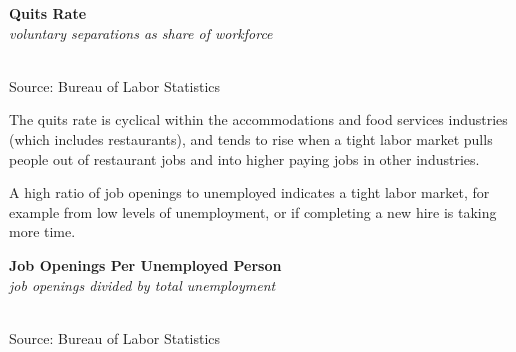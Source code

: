 \documentclass{report}
\makeatletter
\newcommand{\tbllink}[1]{\href{https://raw.githubusercontent.com/bdecon/US-chartbook/master/chartbook/data/#1}{\faTable}}
\newcommand*\short[1]{\expandafter\@gobbletwo\number\numexpr#1\relax}
\newcommand{\absnode}[3]{\node[below right, align=left] at (axis cs: #1,#2) {#3};}
\newcommand{\dateaxisticks}{
		date coordinates in=x, axis line style={draw=none},
		xmax={2023-10-01},
		max space between ticks=40,	    
		xtick={{1990-01-01}, {1992-01-01}, {1994-01-01}, 
			{1996-01-01}, {1998-01-01}, {2000-01-01}, 
			{2002-01-01}, {2004-01-01}, {2006-01-01},
			{2008-01-01}, {2010-01-01}, {2012-01-01}, {2014-01-01},
		    {2016-01-01}, {2018-01-01}, {2020-01-01}, {2022-01-01}, 
		    {2024-01-01}, {2026-01-01}},
		minor xtick={{1989-01-01}, {1991-01-01}, {1993-01-01},
			{1995-01-01}, {1997-01-01}, {1999-01-01}, 
			{2001-01-01}, {2003-01-01}, {2005-01-01}, {2007-01-01},
		    {2009-01-01}, {2011-01-01}, {2013-01-01}, {2015-01-01},
		    {2017-01-01}, {2019-01-01}, {2021-01-01}, {2023-01-01}, 
		    {2025-01-01}, {2027-01-01}},
		enlarge y limits={0.06}, enlarge x limits={0.01},
		}
\newcommand{\shdateaxisticks}{
		date coordinates in=x, axis line style={draw=none},
		xmax={2023-10-01},
		max space between ticks=40,	    
		xtick={{1990-01-01}, {1995-01-01}, {2000-01-01}, 
			{2005-01-01}, {2010-01-01}, {2015-01-01}, {2020-01-01}},
		minor xtick={},
		enlarge y limits={0.06}, enlarge x limits={0.01},
		}
\newcommand{\bbar}[2]{extra #1 ticks = {{#2}}, extra #1 tick labels = ,
		extra #1 tick style = {grid=major, grid style={thick, black!25}},}
\newcommand{\stdline}[4]{\addplot[very thick, no markers, color=#1] 
		table [x=#2, y=#3, col sep=comma] {#4};	}
\newcommand{\thinline}[4]{\addplot[no markers, color=#1] 
		table [x=#2, y=#3, col sep=comma] {#4};	}
\newcommand{\thickline}[4]{\addplot[ultra thick, no markers, color=#1] 
		table [x=#2, y=#3, col sep=comma] {#4};	}
\newcommand{\rebars}{
		\fill[color=black!10] (axis cs:{2007-12-01},\pgfkeysvalueof{/pgfplots/ymin}) rectangle 
			(axis cs:{2009-07-01}, \pgfkeysvalueof{/pgfplots/ymax});
		\fill[color=black!10] (axis cs:{2001-03-01},\pgfkeysvalueof{/pgfplots/ymin}) rectangle 
			(axis cs:{2001-11-01}, \pgfkeysvalueof{/pgfplots/ymax});
		\fill[color=black!10] (axis cs:{2020-02-01},\pgfkeysvalueof{/pgfplots/ymin}) rectangle 
			(axis cs:{2020-05-01}, \pgfkeysvalueof{/pgfplots/ymax});}
\makeatother
\begin{document}
{\begin{minipage}{0.4\textwidth}
\normalsize \textbf{Quits Rate}\\
\footnotesize{\textit{voluntary separations as share of workforce}}\\
\hspace*{-2mm} \\
\footnotesize{Source: Bureau of Labor Statistics} \hfill \tbllink{quits.csv}
\end{minipage}
\hspace{6mm}
\begin{minipage}{0.31\textwidth}
\small The quits rate is cyclical within the accommodations and food services industries (which includes restaurants), and tends to rise when a tight labor market pulls people out of restaurant jobs and into higher paying jobs in other industries. 


\end{minipage}
\newpage
\begin{minipage}{0.76\textwidth}   
\small A high ratio of job openings to unemployed indicates a tight labor market, for example from low levels of unemployment, or if completing a new hire is taking more time. 
\vspace{1mm}

\normalsize \textbf{Job Openings Per Unemployed Person}\\
\footnotesize{\textit{job openings divided by total unemployment}}\\
\hspace*{-2mm} \\
\footnotesize{Source: Bureau of Labor Statistics} \hfill \tbllink{unjo.csv}
\end{minipage}
\vspace{5mm}

}
\end{document}
